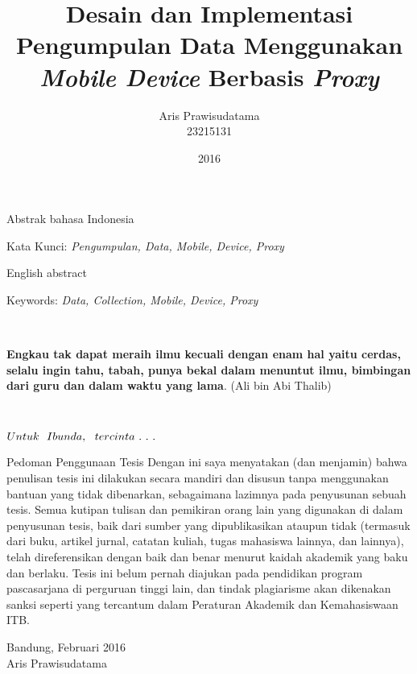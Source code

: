 \documentclass[12pt,a4paper,oneside]{book}
\title{Desain dan Implementasi Pengumpulan Data Menggunakan \textit{Mobile Device} Berbasis \textit{Proxy}}
\author{Aris Prawisudatama\\23215131}
\date{2016}
\numberwithin{equation}{chapter}
\begin{document}
\frontmatter
{}
\makecustompengesahan

\begin{abstrak}[indo]
Abstrak bahasa Indonesia

Kata Kunci: \textit{Pengumpulan, Data, Mobile, Device, Proxy}

\end{abstrak}
\begin{abstrak}[english]
English abstract
  
Keywords: \textit{Data, Collection, Mobile, Device, Proxy}
\end{abstrak}

\
\vspace{5cm}

\begin{center}
\textbf{Engkau tak dapat meraih ilmu kecuali dengan enam hal yaitu cerdas, selalu ingin tahu, tabah, punya bekal dalam menuntut ilmu, bimbingan dari guru dan dalam waktu yang lama}.
(Ali bin Abi Thalib)
\end{center}

\
\vspace{9cm}

\begin{flushright}
\textbf{\large{$\mathnormal{Untuk \  \ Ibunda, \ \ tercinta \ . \ . \ .}$}}
\end{flushright}


    
\begin{custompage}{Pedoman Penggunaan Tesis}
Dengan ini saya menyatakan (dan menjamin) bahwa penulisan tesis ini dilakukan secara mandiri dan disusun tanpa menggunakan bantuan yang tidak dibenarkan, sebagaimana lazimnya pada penyusunan sebuah tesis. Semua kutipan tulisan dan pemikiran orang lain yang digunakan di dalam penyusunan tesis, baik dari sumber yang dipublikasikan ataupun tidak (termasuk dari buku, artikel jurnal, catatan kuliah, tugas mahasiswa lainnya, dan lainnya), telah direferensikan dengan baik dan benar menurut kaidah akademik yang baku dan berlaku. Tesis ini belum pernah diajukan pada pendidikan program pascasarjana di perguruan tinggi lain, dan tindak plagiarisme akan dikenakan sanksi seperti yang tercantum dalam Peraturan Akademik dan Kemahasiswaan ITB.

\begin{flushright}
Bandung, Februari 2016\\[2cm]
Aris Prawisudatama
\end{flushright} 
\end{custompage}
\end{document}
